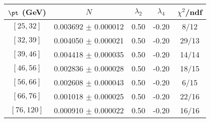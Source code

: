 \begin{tabular}{c||c|c|c|c}
$\pt$ (GeV) & $N$ & $\lambda_{2}$ & $\lambda_4$  & $\chi^2$/ndf  \\
\hline
$[25, 32]$ & 0.003692 $\pm$ 0.000012 & 0.50 & -0.20 & 8/12\\
$[32, 39]$ & 0.004050 $\pm$ 0.000021 & 0.50 & -0.20 & 29/13\\
$[39, 46]$ & 0.004418 $\pm$ 0.000035 & 0.50 & -0.20 & 14/14\\
$[46, 56]$ & 0.002836 $\pm$ 0.000028 & 0.50 & -0.20 & 18/15\\
$[56, 66]$ & 0.002608 $\pm$ 0.000043 & 0.50 & -0.20 & 6/15\\
$[66, 76]$ & 0.001018 $\pm$ 0.000025 & 0.50 & -0.20 & 22/16\\
$[76, 120]$ & 0.000910 $\pm$ 0.000022 & 0.50 & -0.20 & 16/16\\
\end{tabular}

